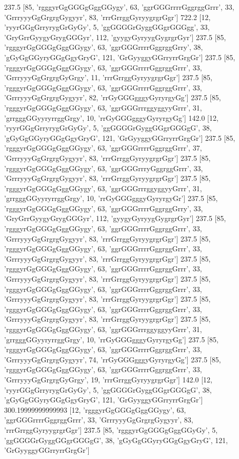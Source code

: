 237.5 [85, 'rgggyrGgGGGgGggGGygy', 63, 'ggrGGGrrrrGggrggGrrr', 33, 'GrrryyyGgGrgrgGygyyr', 83, 'rrrGrrggGyryygrgrGgr']
722.2 [12, 'ryyrGGgGrryrygGrGyGy', 5, 'ggGGGGrGyggGGgrGGGgg', 33, 'GryGrrGyygyGrygGGGyr', 112, 'gyygyGyryygGygrgrGyr']
237.5 [85, 'rgggyrGgGGGgGggGGygy', 63, 'ggrGGGrrrrGggrggGrry', 38, 'gGyGgGGyryGGgGgyGryG', 121, 'GrGyyggyGGrryrrGrgGr']
237.5 [85, 'rgggyrGgGGGgGggGGygy', 63, 'ggrGGGrrrrGggrggGrrr', 33, 'GrrryyyGgGrgrgGyGrgy', 11, 'rrrGrrggGyryygrgrGgr']
237.5 [85, 'rgggyrGgGGGgGggGGygy', 63, 'ggrGGGrrrrGggrggGrrr', 33, 'GrrryyyGgGrgrgGygyyr', 82, 'rrGyGGGgggyGyryrgyGg']
237.5 [85, 'rgggyrGgGGGgGggGGygy', 63, 'ggrGGGrrrggyggyyGrrr', 31, 'grrgggGGyyryrrggGrgy', 10, 'rrGyGGGgggyGyryrgyGg']
142.0 [12, 'ryyrGGgGrryrygGrGyGy', 5, 'ggGGGGrGyggGGgrGGGgG', 38, 'gGyGgGGyryGGgGgyGryG', 121, 'GrGyyggyGGrryrrGrgGr']
237.5 [85, 'rgggyrGgGGGgGggGGygy', 63, 'ggrGGGrrrrGggrggGrrr', 37, 'GrrryyyGgGrgrgGygyyr', 83, 'rrrGrrggGyryygrgrGgr']
237.5 [85, 'rgggyrGgGGGgGggGGygy', 63, 'ggrGGGrrryGggrggGrrr', 33, 'GrrryyyGgGrgrgGygyyr', 83, 'rrrGrrggGyryygrgrGgr']
237.5 [85, 'rgggyrGgGGGgGggGGygy', 63, 'ggrGGGrrrggyggyyGrrr', 31, 'grrgggGGyyryrrggGrgy', 10, 'rrGyGGGgggyGyryrgyGr']
237.5 [85, 'rgggyrGgGGGgGggGGygy', 63, 'ggrGGGrrrrGggrggGrry', 33, 'GryGrrGyygyGrygGGGyr', 112, 'gyygyGyryygGygrgrGyr']
237.5 [85, 'rgggyrGgGGGgGggGGygy', 63, 'ggrGGGrrrrGggrggGrrr', 33, 'GrrryyyGgGrgrgGygyyr', 83, 'rrrGrrggGyryygrgrGgr']
237.5 [85, 'rgggyrGgGGGgGggGGygy', 63, 'ggrGGGrrrrGggrggGrrr', 33, 'GrrryyyGgGrgrgGygyyr', 83, 'rrrGrrggGyryygrgrGgr']
237.5 [85, 'rgggyrGgGGGgGggGGygy', 63, 'ggrGGGrrrrGggrggGrrr', 33, 'GrrryyyGgGrgrgGygyyr', 83, 'rrrGrrggGyryygrgrGgr']
237.5 [85, 'rgggyrGgGGGgGggGGygy', 63, 'ggrGGGrrrrGggrggGrrr', 33, 'GrrryyyGgGrgrgGygyyr', 83, 'rrrGrrggGyryygrgrGgr']
237.5 [85, 'rgggyrGgGGGgGggGGygy', 63, 'ggrGGGrrrrGggrggGrrr', 33, 'GrrryyyGgGrgrgGygyyr', 83, 'rrrGrrggGyryygrgrGgr']
237.5 [85, 'rgggyrGgGGGgGggGGygy', 63, 'ggrGGGrrrggyggyyGrrr', 31, 'grrgggGGyyryrrggGrgy', 10, 'rrGyGGGgggyGyryrgyGg']
237.5 [85, 'rgggyrGgGGGgGggGGygy', 63, 'ggrGGGrrrrGggrggGrrr', 33, 'GrrryyyGgGrgrgGygyyr', 74, 'rrGyGGGgggyGyryrgyGg']
237.5 [85, 'rgggyrGgGGGgGggGGygy', 63, 'ggrGGGrrrrGggrggGrrr', 33, 'GrrryyyGgGrgrgGyGrgy', 19, 'rrrGrrggGyryygrgrGgr']
142.0 [12, 'ryyrGGgGrryrygGrGyGy', 5, 'ggGGGGrGyggGGgrGGGgG', 38, 'gGyGgGGyryGGgGgyGryG', 121, 'GrGyyggyGGrryrrGrgGr']
300.19999999999993 [12, 'rgggyrGgGGGgGggGGygy', 63, 'ggrGGGrrrrGggrggGrrr', 33, 'GrrryyyGgGrgrgGygyyr', 83, 'rrrGrrggGyryygrgrGgr']
237.5 [85, 'rgggyrGgGGGgGggGGyGy', 5, 'ggGGGGrGyggGGgrGGGgG', 38, 'gGyGgGGyryGGgGgyGryG', 121, 'GrGyyggyGGrryrrGrgGr']
